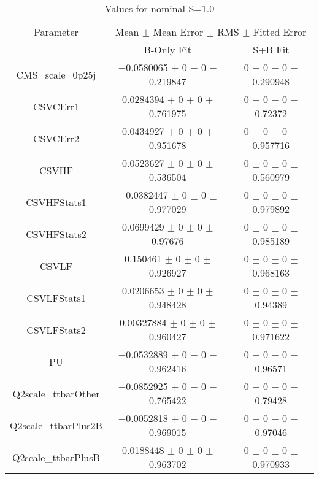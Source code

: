 \begin{table}
\centering
\caption{Values for nominal S=1.0}
\begin{tabular}{ccc}
\toprule
Parameter & \multicolumn{2}{c}{Mean $\pm$ Mean Error $\pm$ RMS $\pm$ Fitted Error}\\
 & B-Only Fit & S+B Fit\\
\midrule
CMS\_scale\_0p25j & \num{-0.0580065} $\pm$ \num{0} $\pm$ \num{0} $\pm$ \num{0.219847} & \num{0} $\pm$ \num{0} $\pm$ \num{0} $\pm$ \num{0.290948}\\
CSVCErr1 & \num{0.0284394} $\pm$ \num{0} $\pm$ \num{0} $\pm$ \num{0.761975} & \num{0} $\pm$ \num{0} $\pm$ \num{0} $\pm$ \num{0.72372}\\
CSVCErr2 & \num{0.0434927} $\pm$ \num{0} $\pm$ \num{0} $\pm$ \num{0.951678} & \num{0} $\pm$ \num{0} $\pm$ \num{0} $\pm$ \num{0.957716}\\
CSVHF & \num{0.0523627} $\pm$ \num{0} $\pm$ \num{0} $\pm$ \num{0.536504} & \num{0} $\pm$ \num{0} $\pm$ \num{0} $\pm$ \num{0.560979}\\
CSVHFStats1 & \num{-0.0382447} $\pm$ \num{0} $\pm$ \num{0} $\pm$ \num{0.977029} & \num{0} $\pm$ \num{0} $\pm$ \num{0} $\pm$ \num{0.979892}\\
CSVHFStats2 & \num{0.0699429} $\pm$ \num{0} $\pm$ \num{0} $\pm$ \num{0.97676} & \num{0} $\pm$ \num{0} $\pm$ \num{0} $\pm$ \num{0.985189}\\
CSVLF & \num{0.150461} $\pm$ \num{0} $\pm$ \num{0} $\pm$ \num{0.926927} & \num{0} $\pm$ \num{0} $\pm$ \num{0} $\pm$ \num{0.968163}\\
CSVLFStats1 & \num{0.0206653} $\pm$ \num{0} $\pm$ \num{0} $\pm$ \num{0.948428} & \num{0} $\pm$ \num{0} $\pm$ \num{0} $\pm$ \num{0.94389}\\
CSVLFStats2 & \num{0.00327884} $\pm$ \num{0} $\pm$ \num{0} $\pm$ \num{0.960427} & \num{0} $\pm$ \num{0} $\pm$ \num{0} $\pm$ \num{0.971622}\\
PU & \num{-0.0532889} $\pm$ \num{0} $\pm$ \num{0} $\pm$ \num{0.962416} & \num{0} $\pm$ \num{0} $\pm$ \num{0} $\pm$ \num{0.96571}\\
Q2scale\_ttbarOther & \num{-0.0852925} $\pm$ \num{0} $\pm$ \num{0} $\pm$ \num{0.765422} & \num{0} $\pm$ \num{0} $\pm$ \num{0} $\pm$ \num{0.79428}\\
Q2scale\_ttbarPlus2B & \num{-0.0052818} $\pm$ \num{0} $\pm$ \num{0} $\pm$ \num{0.969015} & \num{0} $\pm$ \num{0} $\pm$ \num{0} $\pm$ \num{0.97046}\\
Q2scale\_ttbarPlusB & \num{0.0188448} $\pm$ \num{0} $\pm$ \num{0} $\pm$ \num{0.963702} & \num{0} $\pm$ \num{0} $\pm$ \num{0} $\pm$ \num{0.970933}\\

\end{tabular}
\end{table}
